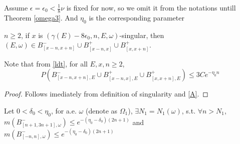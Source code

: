 Assume $\epsilon=\epsilon_0<\frac{1}{8}\nu$ is fixed for now, so we omit it from the notations untill Theorem \ref{omega3}. And $\eta_0$ is the corresponding parameter
\begin{lemma}\label{lemma1}
 $n \geq 2$, if $x$ is $(\gamma(E)-8\epsilon_0,n,E,\omega)$-singular, then $(E,\omega)\in B_{[x-n,x+n]}^-\cup B_{[x-n,x]}^+\cup B_{[x,x+n]}^+$.
\end{lemma}
\begin{remark}
  Note that from \eqref{ldt}, for all $E,x,n\geq 2$,
  \[
    P(B_{[x-n,x+n],E}^-\cup B_{[x-n,x],E}^+\cup B_{[x,x+n],E}^+)\leq 3Ce^{-\eta_0 n}
  \]
\end{remark}
\begin{proof}
Follows imediately from definition of singularity and \eqref{A}.
\end{proof}


\begin{thm}\label{omega1}
  Let $0<\delta_0<\eta_0$, for a.e. $\omega$ (denote as $\Omega_1$), $\exists N_1=N_1(\omega)$, s.t. $\forall n>N_1$, $m(B_{[n+1,3n+1],\omega}^-)\leq e^{-(\eta_0-\delta_0)(2n+1)}$ and $m(B_{[-n,n],\omega}^-)\leq e^{-(\eta_0-\delta_0)(2n+1)}$
\end{thm}


